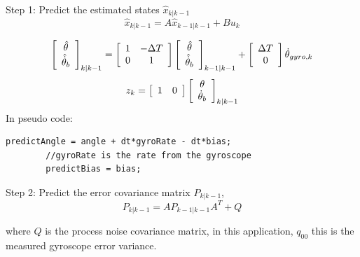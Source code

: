 \documentclass[a4paper]{report}
\begin{document}
		Step 1: Predict the estimated states $\hat{x}_{k|k-1}$
		\begin{equation}
		\hat{x}_{k|k-1}=A\hat{x}_{k-1|k-1}+Bu_{k}
		\end{equation}

		\begin{equation}
		\left[
      		\begin{array}{c}
      		\hat{\theta}\\
		\hat{\dot{\theta}}_{b}
      		\end{array} \right]_{k|k-1}
		=
		\left[
		\begin{array}{c c}
		1 & - \Delta T\\
		0 & 1
		\end{array} \right]
		\left[
		\begin{array}{c}
		\hat{\theta}\\
		\hat{\dot{\theta}}_{b}
		\end{array} \right]_{k-1|k-1}
		+
		\left[
		\begin{array}{c}
		\Delta T\\
		0
		\end{array} \right]
		\dot{\theta}_{gyro, k}\\
		\end{equation}
		\begin{equation}
		z_{k}=
		\left[
		\begin{array}{c c}
		1 & 0
		\end{array} \right]
		\left[
		\begin{array}{c}
		\theta\\
		\dot{\theta}_{b}
		\end{array} \right]_{k|k-1}
		\end{equation}
    In pseudo code:
    \begin{lstlisting}[frame=single]
		predictAngle = angle + dt*gyroRate - dt*bias;
		//gyroRate is the rate from the gyroscope
		predictBias = bias;
		\end{lstlisting}

		Step 2: Predict the error covariance matrix $P_{k|k-1}$,
		\begin{equation}
		P_{k|k-1}=AP_{k-1|k-1}A^{T}+Q
		\end{equation}

		where $Q$ is the process noise covariance matrix, in this application, $q_{00}$ this is the measured gyroscope error variance.
\end{document}
